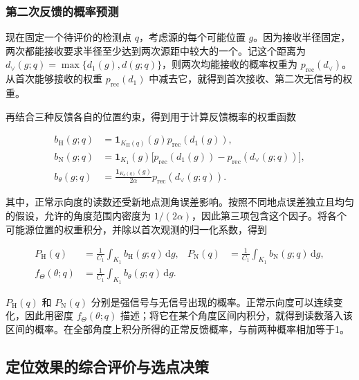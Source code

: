 \documentclass[UTF8,a4paper,zihao=-4,fontset=none]{ctexart}
\begin{document}
\subsubsection{第二次反馈的概率预测}

现在固定一个待评价的检测点 \(q\)，考虑源的每个可能位置 \(g\)。因为接收半径固定，两次都能接收要求半径至少达到两次源距中较大的一个。记这个距离为 \(d_\vee(g;q)=\max\{d_1(g),d(g;q)\}\)，则两次均能接收的概率权重为 \(p_{\mathrm{rec}}(d_\vee)\)。从首次能够接收的权重 \(p_{\mathrm{rec}}(d_1)\) 中减去它，就得到首次接收、第二次无信号的权重。

再结合三种反馈各自的位置约束，得到用于计算反馈概率的权重函数

\begin{equation}
\begin{aligned}
 b_{\mathrm H}(g;q)&=\mathbf1_{K_{\mathrm H}(q)}(g)p_{\mathrm{rec}}(d_1(g)),\\
 b_{\mathrm N}(g;q)&=\mathbf1_{K_1}(g)\bigl[p_{\mathrm{rec}}(d_1(g))-p_{\mathrm{rec}}(d_\vee(g;q))\bigr],\\
 b_\theta(g;q)&=\frac{\mathbf1_{K_\theta(q)}(g)}{2\alpha}p_{\mathrm{rec}}(d_\vee(g;q)).
\end{aligned}
\label{eq:q2-pair-feedback-weights}
\end{equation}

其中，正常示向度的读数还受新地点测角误差影响。按照不同地点误差独立且均匀的假设，允许的角度范围内密度为 \(1/(2\alpha)\)，因此第三项包含这个因子。将各个可能源位置的权重积分，并除以首次观测的归一化系数，得到

\begin{equation}
\begin{aligned}
 P_{\mathrm H}(q)&=\frac{1}{C_1}\int_{K_1}b_{\mathrm H}(g;q)\,\mathrm dg,
 &P_{\mathrm N}(q)&=\frac{1}{C_1}\int_{K_1}b_{\mathrm N}(g;q)\,\mathrm dg,\\
 f_\Theta(\theta;q)&=\frac{1}{C_1}\int_{K_1}b_\theta(g;q)\,\mathrm dg.
\end{aligned}
\label{eq:q2-pair-prediction}
\end{equation}

\(P_{\mathrm H}(q)\) 和 \(P_{\mathrm N}(q)\) 分别是强信号与无信号出现的概率。正常示向度可以连续变化，因此用密度 \(f_\Theta(\theta;q)\) 描述；将它在某个角度区间内积分，就得到读数落入该区间的概率。在全部角度上积分所得的正常反馈概率，与前两种概率相加等于1。

\subsection{定位效果的综合评价与选点决策}
\end{document}
